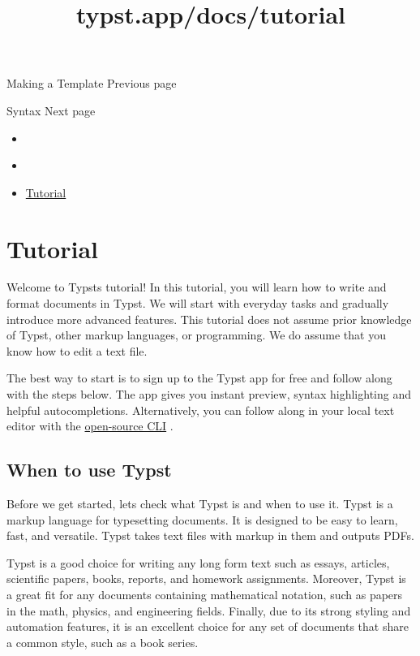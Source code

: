 \href{/docs/tutorial/making-a-template/}{\pandocbounded{}}

{ Making a Template } { Previous page }

\href{/docs/reference/syntax/}{\pandocbounded{}}

{ Syntax } { Next page }


\title{typst.app/docs/tutorial}

\begin{itemize}
\tightlist
\item
  \href{/docs}{}
\item
  
\item
  \href{/docs/tutorial/}{Tutorial}
\end{itemize}

\section{Tutorial}\label{tutorial}

Welcome to Typst\textquotesingle s tutorial! In this tutorial, you will
learn how to write and format documents in Typst. We will start with
everyday tasks and gradually introduce more advanced features. This
tutorial does not assume prior knowledge of Typst, other markup
languages, or programming. We do assume that you know how to edit a text
file.

The best way to start is to sign up to the Typst app for free and follow
along with the steps below. The app gives you instant preview, syntax
highlighting and helpful autocompletions. Alternatively, you can follow
along in your local text editor with the
\href{https://github.com/typst/typst}{open-source CLI} .

\subsection{When to use Typst}\label{when-typst}

Before we get started, let\textquotesingle s check what Typst is and
when to use it. Typst is a markup language for typesetting documents. It
is designed to be easy to learn, fast, and versatile. Typst takes text
files with markup in them and outputs PDFs.

Typst is a good choice for writing any long form text such as essays,
articles, scientific papers, books, reports, and homework assignments.
Moreover, Typst is a great fit for any documents containing mathematical
notation, such as papers in the math, physics, and engineering fields.
Finally, due to its strong styling and automation features, it is an
excellent choice for any set of documents that share a common style,
such as a book series.

